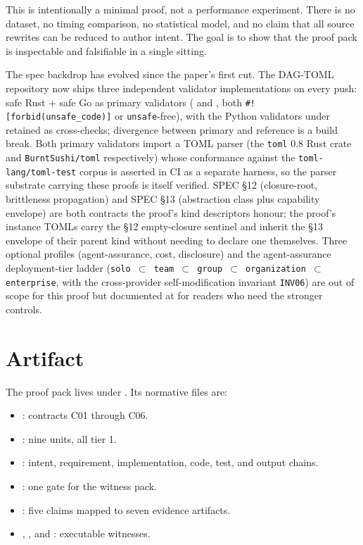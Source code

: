 \documentclass[11pt,letterpaper]{article}
\newcommand{\dagtoml}{DAG-TOML}
\begin{document}
This is intentionally a minimal proof, not a performance experiment.
There is no dataset, no timing comparison, no statistical model, and no
claim that all source rewrites can be reduced to author intent. The
goal is to show that the proof pack is inspectable and falsifiable in a
single sitting.

The spec backdrop has evolved since the paper's first cut. The
\dagtoml{} repository now ships three independent validator
implementations on every push: safe Rust + safe Go as primary
validators ( and
, both \texttt{\#![forbid(unsafe\_code)]}
or \texttt{unsafe}-free), with the Python validators under
 retained as cross-checks; divergence between
primary and reference is a build break. Both primary validators
import a TOML parser (the \texttt{toml} 0.8 Rust crate and
\texttt{BurntSushi/toml} respectively) whose conformance against
the \texttt{toml-lang/toml-test} corpus is asserted in CI as a
separate harness, so the parser substrate carrying these proofs is
itself verified. SPEC \S 12 (closure-root, brittleness propagation)
and SPEC \S 13 (abstraction class plus capability envelope) are
both contracts the proof's kind descriptors honour; the proof's
instance TOMLs carry the \S 12 empty-closure sentinel and inherit
the \S 13 envelope of their parent kind without needing to declare
one themselves. Three optional profiles (agent-assurance, cost,
disclosure) and the agent-assurance deployment-tier ladder
(\texttt{solo $\subset$ team $\subset$ group $\subset$ organization
$\subset$ enterprise}, with the cross-provider self-modification
invariant \texttt{INV06}) are out of scope for this proof but
documented at  for readers who need the stronger
controls.

\section{Artifact}

The proof pack lives under . Its
normative files are:

\begin{itemize}
  \item {}: contracts C01 through C06.
  \item {}: nine units, all tier 1.
  \item {}: intent, requirement, implementation,
        code, test, and output chains.
  \item {}: one gate for the witness pack.
  \item {}: five claims mapped to seven
        evidence artifacts.
  \item {}, , and
        : executable witnesses.
\end{itemize}
\end{document}
